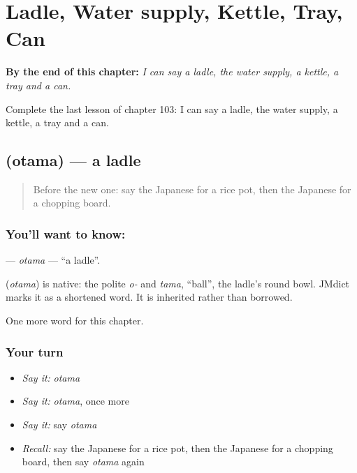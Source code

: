 
\chapter{Ladle, Water supply, Kettle, Tray, Can}
\label{ch:ja-ladle-water-supply-kettle-tray-can}

\begin{chapteropening}
\textbf{By the end of this chapter:} \emph{I can say a ladle, the water supply, a kettle, a tray and a can.}

Complete the last lesson of chapter 103: I can say a ladle, the water supply, a kettle, a tray and a can.
\end{chapteropening}

\section[\texorpdfstring{\ja{おたま} (otama)}{おたま (otama)}]{ (otama) — a ladle}

\label{lesson:JA-C103-otama}



\begin{quote}
Before the new one: say the Japanese for a rice pot, then the Japanese for a chopping board.
\end{quote}

\subsection*{You'll want to know: }
\textbf{} — \emph{otama} — \textquotedblleft{}a ladle\textquotedblright{}.

\begin{cousinweb}
\textbf{} (\emph{otama}) is native: the polite \emph{o-} and \emph{tama}, \textquotedblleft{}ball\textquotedblright{}, the ladle's round bowl. JMdict marks it as a shortened word. It is inherited rather than borrowed.
\end{cousinweb}

\begin{grammarlens}[title={What you've built}]
One more word for this chapter.
\end{grammarlens}

\subsection*{Your turn}
\begin{itemize}
\raggedright
  \item \emph{Say it:} \emph{otama}
  \item \emph{Say it:} \emph{otama}, once more
  \item \emph{Say it:} say \emph{otama}
  \item \emph{Recall:} say the Japanese for a rice pot, then the Japanese for a chopping board, then say \emph{otama} again
\end{itemize}

